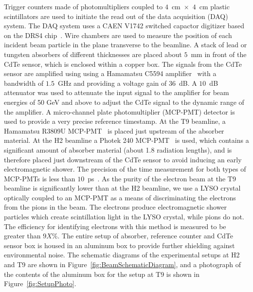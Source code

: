 Trigger counters made of photomultipliers coupled to $4$~$\mathrm{cm}$~$\times$~$4$~$\mathrm{cm}$ 
plastic scintillators are used 
to initiate the read out of the data acquisition (DAQ) system. The DAQ system
uses a CAEN V1742 switched capactor digitizer based on the DRS4 chip~\cite{DRS4}. Wire chambers
are used to measure the position of each incident beam particle in the plane transverse
to the beamline. A stack of lead or tungsten absorbers of different thicknesses are 
placed about $5$~mm in front of the CdTe sensor, which is 
enclosed within a copper box. The signals from the CdTe sensor are amplified using 
using a Hamamatsu C5594 amplifier~\cite{HamaAmpDataSheet} with a bandwidth of
$1.5$~GHz and providing a voltage gain of $36$~dB. A $10$~dB attenuator was used to attenuate the input signal 
to the amplifier for beam energies of 50 GeV and above to adjust the CdTe signal to the dynamic range of the amplifier. 
A micro-channel plate photomultiplier (MCP-PMT)
detector is used to provide a very precise reference timestamp. At the T9 beamline,
a Hamamatsu R3809U MCP-PMT~\cite{HamaMCPDataSheet} is placed just upstream of the absorber material. 
At the H2 beamline a Photek 240 MCP-PMT~\cite{PhotekDataSheet} is used, which contains a significant 
amount of absorber material (about 1.8 radiation lengths), and is therefore placed 
just downstream of the CdTe sensor to avoid inducing an early electromagnetic shower.
The precision of the time measurement for both types of MCP-PMTs is less than 
$10$~ps~\cite{MCPShowerMaxPaper,Anderson:2015gha}. As the purity of the electron beam at the T9 beamline is
significantly lower than at the H2 beamline, we use a LYSO crystal
optically coupled to an MCP-PMT as a means of discriminating the electrons from the pions
in the beam. The electrons produce electromagnetic shower particles which create
scintillation light in the LYSO crystal, while pions do not. The efficiency for 
identifying electrons with this method is measured to be greater than $9X\%$.
The entire setup of absorber, reference counter and CdTe sensor box is housed in an aluminum
box to provide further shielding against environmental noise.
The schematic diagrams of the experimental setups at H2 and T9 
are shown in Figure~\ref{fig:BeamSchematicDiagram}, and a photograph
of the contents of the aluminum box for the setup at T9 is shown in 
Figure~\ref{fig:SetupPhoto}.


